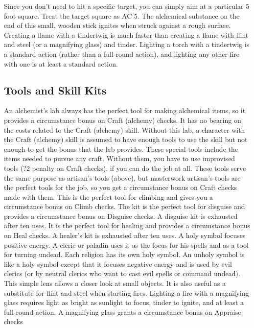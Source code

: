 \par Since you don't need to hit a specific target, you can simply aim at a particular 5 foot square. Treat the target square as AC 5.
 The alchemical substance on the end of this small, wooden stick ignites when struck against a rough surface. Creating a flame with a tindertwig is much faster than creating a flame with flint and steel (or a magnifying glass) and tinder. Lighting a torch with a tindertwig is a standard action (rather than a full-round action), and lighting any other fire with one is at least a standard action.

\subsection{Tools and Skill Kits}
 An alchemist's lab always has the perfect tool for making alchemical items, so it provides a  circumstance bonus on Craft (alchemy) checks. It has no bearing on the costs related to the Craft (alchemy) skill. Without this lab, a character with the Craft (alchemy) skill is assumed to have enough tools to use the skill but not enough to get the  bonus that the lab provides.
 These special tools include the items needed to pursue any craft. Without them, you have to use improvised tools (?2 penalty on Craft checks), if you can do the job at all.
 These tools serve the same purpose as artisan's tools (above), but masterwork artisan's tools are the perfect tools for the job, so you get a  circumstance bonus on Craft checks made with them.
 This is the perfect tool for climbing and gives you a  circumstance bonus on Climb checks.
 The kit is the perfect tool for disguise and provides a  circumstance bonus on Disguise checks. A disguise kit is exhausted after ten uses.
 It is the perfect tool for healing and provides a  circumstance bonus on Heal checks. A healer's kit is exhausted after ten uses.
 A holy symbol focuses positive energy. A cleric or paladin uses it as the focus for his spells and as a tool for turning undead. Each religion has its own holy symbol.
 An unholy symbol is like a holy symbol except that it focuses negative energy and is used by evil clerics (or by neutral clerics who want to cast evil spells or command undead).
 This simple lens allows a closer look at small objects. It is also useful as a substitute for flint and steel when starting fires. Lighting a fire with a magnifying glass requires light as bright as sunlight to focus, tinder to ignite, and at least a full-round action. A magnifying glass grants a  circumstance bonus on Appraise checks
